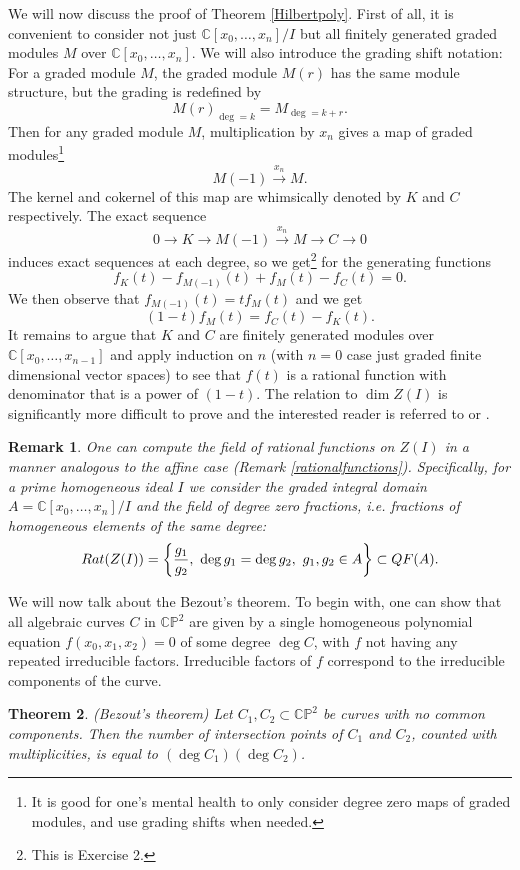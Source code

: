 \documentclass[11pt]{article}
\numberwithin{equation}{section}
\numberwithin{footnote}{section}
\newtheorem{thm}{Theorem}[section]
\newtheorem{rem}[thm]{Remark}
\newcommand{\blue}{\color{blue}}
\renewcommand{\P}{{\mathbb P}}
\newcommand{\C}{{\mathbb C}}
\begin{document}
\smallskip
We will now discuss the proof of Theorem \ref{Hilbertpoly}. First of all, it is convenient to  consider not just $\C[x_0,\ldots,x_n]/I$ but all finitely generated graded modules $M$ over $\C[x_0,\ldots,x_n]$. We will also introduce the {\blue grading shift} notation:
For a graded module $M$, the graded module $M(r)$ has the same module structure, but the grading is redefined by
$$
M(r)_{\deg = k} = M_{\deg = k+r}.
$$
Then for any graded module $M$, multiplication by $x_n$ gives a map of graded modules\footnote{ It is good for one's mental health to only consider degree zero maps of graded modules, and use grading shifts when needed.} 
$$
M(-1) \stackrel {x_n}\longrightarrow M.
$$
The kernel and cokernel of this map are whimsically denoted by $K$ and $C$ respectively.
The exact sequence 
$$
0\to K\to M(-1)  \stackrel {x_n}\longrightarrow M \to C\to 0
$$
induces exact sequences at each degree, so we get\footnote{ This is Exercise 2.} for the generating functions
\begin{equation}\label{ex2}
f_{K}(t) - f_{M(-1)}(t) + f_M(t) - f_{C}(t) = 0.
\end{equation}
We then observe that $f_{M(-1)}(t) = t f_M(t)$ and we get 
$$(1-t)f_M(t) = f_C(t) - f_K(t).$$ It remains to argue that $K$ and $C$ are finitely generated modules over $\C[x_0,\ldots,x_{n-1}]$ and apply induction on $n$ (with $n=0$ case just graded finite dimensional vector spaces) to see that $f(t)$ is a rational function with denominator that is a power of $(1-t)$. The relation to $\dim Z(I)$ is significantly more difficult to prove and the interested reader is referred to 
\cite{AM} or \cite{Eisenbud}. 

\smallskip
\begin{rem}\label{rationalfunctionsprojective}
One can compute the field of rational functions on $Z(I)$ in a manner analogous to the affine case (Remark \ref{rationalfunctions}).
Specifically, for a prime homogeneous ideal $I$ we consider the graded integral domain $A=\C[x_0,\ldots,x_n]/I$ and the field of degree zero fractions, i.e. fractions of homogeneous elements of the same degree:
$$
{\rm Rat}(Z(I))= \left\{\frac {g_1}{g_2},~\deg g_1 = \deg g_2,~g_1,g_2\in A\right\} \subset QF(A).
$$
\end{rem}


\smallskip{\blue \hrule}
We will now talk about the Bezout's theorem. To begin with, one can show that all algebraic curves $C$ in $\C\P^2$ are given by a single homogeneous polynomial equation $f(x_0,x_1,x_2)=0$ of some degree $\deg C$, with $f$ not having any repeated irreducible factors.  Irreducible factors of $f$ correspond to the irreducible components of the curve. 
\smallskip
\begin{thm}\label{Bezout}(Bezout's theorem)
Let $C_1,C_2\subset \C\P^2$ be curves with no common components. Then the number of intersection points of $C_1$ and $C_2$, counted with multiplicities, is equal to $(\deg C_1)(\deg C_2)$. 
\end{thm}
\end{document}
